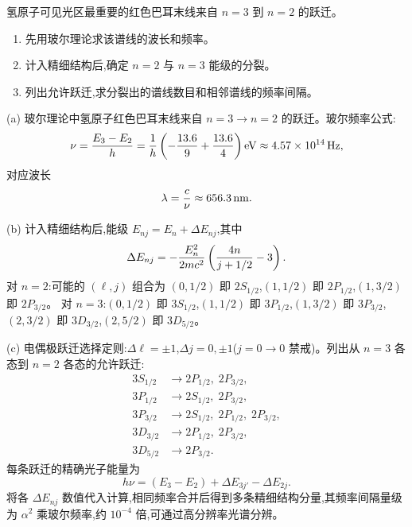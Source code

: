 \begin{question}
氢原子可见光区最重要的红色巴耳末线来自 $n=3$ 到 $n=2$ 的跃迁。
\begin{enumerate}
\item 先用玻尔理论求该谱线的波长和频率。
\item 计入精细结构后,确定 $n=2$ 与 $n=3$ 能级的分裂。
\item 列出允许跃迁,求分裂出的谱线数目和相邻谱线的频率间隔。
\end{enumerate}
\end{question}
\begin{solution}
(a) 玻尔理论中氢原子红色巴耳末线来自 $n=3\to n=2$ 的跃迁。玻尔频率公式:
\[
\nu={E_3-E_2\over h}
={1\over h}\left(-{13.6\over9}+{13.6\over4}\right)\mathrm{eV}
\approx 4.57\times10^{14}\,\mathrm{Hz},
\]
对应波长
\[
\lambda={c\over\nu}\approx 656.3\,\mathrm{nm}.
\]

(b) 计入精细结构后,能级 $E_{nj}=E_n+\Delta E_{nj}$,其中
\[
\Delta E_{nj}=-{E_n^2\over2mc^2}\left({4n\over j+1/2}-3\right).
\]
对 $n=2$:可能的 $(\ell,j)$ 组合为 $(0,1/2)$ 即 $2S_{1/2}$,$(1,1/2)$ 即 $2P_{1/2}$,$(1,3/2)$ 即 $2P_{3/2}$。
对 $n=3$:$(0,1/2)$ 即 $3S_{1/2}$,$(1,1/2)$ 即 $3P_{1/2}$,$(1,3/2)$ 即 $3P_{3/2}$,$(2,3/2)$ 即 $3D_{3/2}$,$(2,5/2)$ 即 $3D_{5/2}$。

(c) 电偶极跃迁选择定则:$\Delta\ell=\pm1$,$\Delta j=0,\pm1$($j=0\to0$ 禁戒)。列出从 $n=3$ 各态到 $n=2$ 各态的允许跃迁:
\[
\begin{aligned}
3S_{1/2} &\to 2P_{1/2},\; 2P_{3/2},\\
3P_{1/2} &\to 2S_{1/2},\; 2P_{3/2},\\
3P_{3/2} &\to 2S_{1/2},\; 2P_{1/2},\; 2P_{3/2},\\
3D_{3/2} &\to 2P_{1/2},\; 2P_{3/2},\\
3D_{5/2} &\to 2P_{3/2}.
\end{aligned}
\]
每条跃迁的精确光子能量为
\[
h\nu = (E_3-E_2) + \Delta E_{3j'} - \Delta E_{2j}.
\]
将各 $\Delta E_{nj}$ 数值代入计算,相同频率合并后得到多条精细结构分量,其频率间隔量级为 $\alpha^2$ 乘玻尔频率,约 $10^{-4}$ 倍,可通过高分辨率光谱分辨。
\end{solution}

